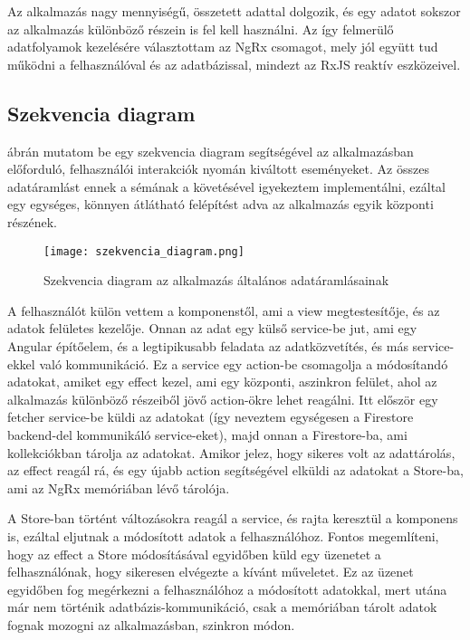 \documentclass[a4paper,12pt]{report}
\begin{document}
Az alkalmazás nagy mennyiségű, összetett adattal dolgozik, és egy adatot sokszor az alkalmazás különböző részein is fel kell használni. Az így felmerülő adatfolyamok kezelésére választottam az NgRx csomagot, mely jól együtt tud működni a felhasználóval és az adatbázissal, mindezt az RxJS reaktív eszközeivel.

\subsection{Szekvencia diagram}

 ábrán mutatom be egy szekvencia diagram segítségével az alkalmazásban előforduló, felhasználói interakciók nyomán kiváltott eseményeket. Az összes adatáramlást ennek a sémának a követésével igyekeztem implementálni, ezáltal egy egységes, könnyen átlátható felépítést adva az alkalmazás egyik központi részének.

\begin{figure}
    \centering
    \texttt{[image: szekvencia\_diagram.png]}
    \caption{Szekvencia diagram az alkalmazás általános adatáramlásainak}
    \label{fig:SequenceDiagram}
\end{figure}

A felhasználót külön vettem a komponenstől, ami a view megtestesítője, és az adatok felületes kezelője. Onnan az adat egy külső service-be jut, ami egy Angular építőelem, és a legtipikusabb feladata az adatközvetítés, és más service-ekkel való kommunikáció. Ez a service egy action-be csomagolja a módosítandó adatokat, amiket egy effect kezel, ami egy központi, aszinkron felület, ahol az alkalmazás különböző részeiből jövő action-ökre lehet reagálni. Itt először egy fetcher service-be küldi az adatokat (így neveztem egységesen a Firestore backend-del kommunikáló service-eket), majd onnan a Firestore-ba, ami kollekciókban tárolja az adatokat. Amikor jelez, hogy sikeres volt az adattárolás, az effect reagál rá, és egy újabb action segítségével elküldi az adatokat a Store-ba, ami az NgRx memóriában lévő tárolója.

A Store-ban történt változásokra reagál a service, és rajta keresztül a komponens is, ezáltal eljutnak a módosított adatok a felhasználóhoz. Fontos megemlíteni, hogy az effect a Store módosításával egyidőben küld egy üzenetet a felhasználónak, hogy sikeresen elvégezte a kívánt műveletet. Ez az üzenet egyidőben fog megérkezni a felhasználóhoz a módosított adatokkal, mert utána már nem történik adatbázis-kommunikáció, csak a memóriában tárolt adatok fognak mozogni az alkalmazásban, szinkron módon.
\end{document}
